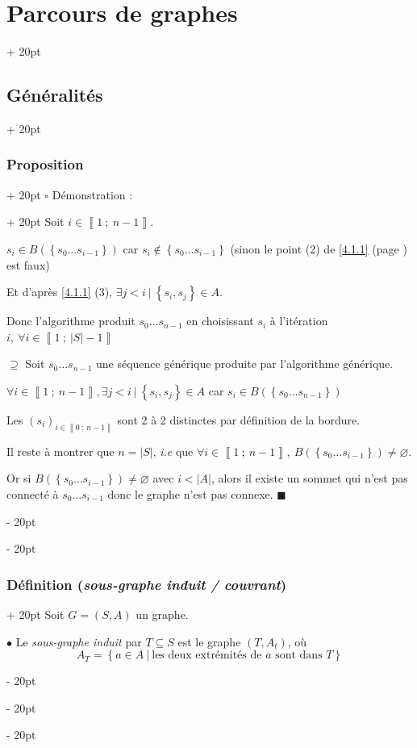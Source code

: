 \documentclass[a4paper, 12pt, twoside]{article}
\newcommand{\nset}[2]{\left\llbracket #1\ ;\ #2 \right\rrbracket}
\newcommand{\set}[1]{\left\{ #1 \right\}}
\newcommand{\abs}[1]{\left\lvert #1 \right\rvert}
\newcommand{\ind}[1][20pt]{\advance\leftskip + #1}
\newcommand{\deind}[1][20pt]{\advance\leftskip - #1}
\newenvironment{indt}[2][20pt]{#2 \par \ind[#1]}{\par \deind} %
\begin{document}
\begin{indt}{\section{Parcours de graphes}}
\begin{indt}{\subsection{Généralités}}
\begin{indt}{\subsubsection{Proposition}}
\begin{indt}{$\square$ Démonstration :}
                    Soit $i \in \nset {1}{n - 1}$.

                    $s_i \in B(\set{s_0 \ldots s_{i - 1}})$ car $s_i \notin \set {s_0 \ldots s_{i - 1}}$ (sinon le point (2) de \ref{4.1.1} (page \pageref{4.1.1}) est faux)

                    Et d'après \ref{4.1.1} (3), $\exists j < i\ |\ \set{s_i, s_j} \in A$.

                    Donc l'algorithme produit $s_0 \ldots s_{n - 1}$ en choisissant $s_i$ à l'itération $i,\ \forall i \in \nset{1}{\abs S - 1}$

                    \vspace{12pt}
                    
                    $\boxed{\supseteq}$ Soit $s_0 \ldots s_{n - 1}$ une séquence générique produite par l'algorithme générique.

                    $\forall i \in \nset 1 {n - 1}, \exists j < i\ |\ \set{s_i, s_j} \in A$ car $s_i \in B(\set{s_0 \ldots s_{n - 1}})$

                    Les $(s_i)_{i \in \nset{0}{n - 1}}$ sont 2 à 2 distinctes par définition de la bordure.

                    Il reste à montrer que $n = \abs S$, \textit{i.e} que $\forall i \in \nset 1 {n - 1},\ B(\set{s_0 \ldots s_{i - 1}}) \neq \varnothing$.

                    Or si $B(\set{s_0 \ldots s_{i - 1}}) \neq \varnothing$ avec $i < \abs A$, alors il existe un sommet qui n'est pas connecté à $s_0 \ldots s_{i - 1}$ donc le graphe n'est pas connexe. $\blacksquare$
                \end{indt}
            \end{indt}

            \vspace{12pt}
            
            \begin{indt}{\subsubsection{Définition (\textit{sous-graphe induit / couvrant})}}
                Soit $G = (S, A)$ un graphe.

                $\bullet$ Le \textit{sous-graphe induit} par $T \subseteq S$ est le graphe $(T, A_t)$, où
                \[
                    A_T = \set{a \in A\ |\ \text{les deux extrémités de $a$ sont dans $T$}}
                \]


\end{indt}
\end{indt}
\end{indt}
\end{document}
